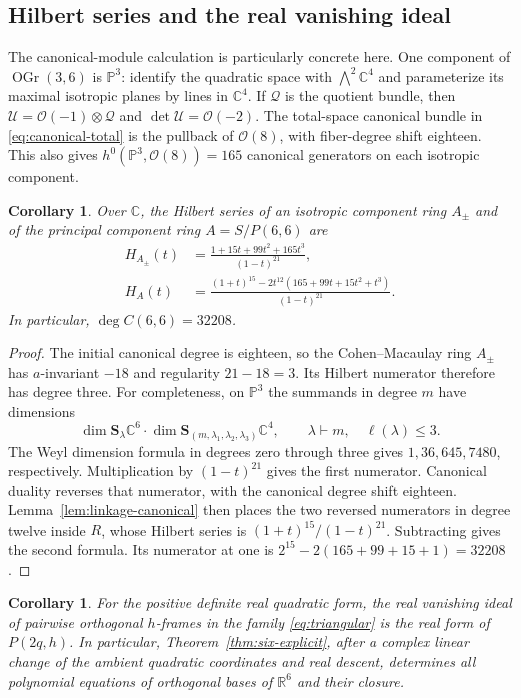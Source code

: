 \documentclass[11pt]{article}
\newtheorem{corollary}[theorem]{Corollary}
\theoremstyle{definition}
\theoremstyle{remark}
\numberwithin{equation}{section}
\DeclareMathOperator{\OGr}{OGr}
\newcommand{\CC}{\mathbb C}
\newcommand{\RR}{\mathbb R}
\newcommand{\PP}{\mathbb P}
\newcommand{\OO}{\mathcal O}
\newcommand{\UU}{\mathcal U}
\newcommand{\Schur}{\mathbf S}
\begin{document}
\subsection{Hilbert series and the real vanishing ideal}

The canonical-module calculation is particularly concrete here.
One component of $\OGr(3,6)$ is $\PP^3$: identify the quadratic
space with $\bigwedge^2\CC^4$ and parameterize its maximal isotropic
planes by lines in $\CC^4$. If $\mathcal Q$ is the quotient bundle,
then $\UU=\OO(-1)\otimes\mathcal Q$ and $\det\UU=\OO(-2)$.
The total-space canonical bundle in \eqref{eq:canonical-total} is
the pullback of $\OO(8)$, with fiber-degree shift eighteen. This
also gives $h^0(\PP^3,\OO(8))=165$ canonical generators on each
isotropic component.

\begin{corollary}\label{cor:Hilbert}
Over $\CC$, the Hilbert series of an isotropic component ring $A_\pm$
and of the principal component ring $A=S/P(6,6)$ are
\begin{align*}
 H_{A_\pm}(t)&=\frac{1+15t+99t^2+165t^3}{(1-t)^{21}},\\
 H_A(t)&=\frac{(1+t)^{15}-2t^{12}(165+99t+15t^2+t^3)}{(1-t)^{21}}.
\end{align*}
In particular, $\deg C(6,6)=32208$.
\end{corollary}

\begin{proof}
The initial canonical degree is eighteen, so the Cohen--Macaulay ring
$A_\pm$ has $a$-invariant $-18$ and regularity $21-18=3$. Its
Hilbert numerator therefore has degree three. For completeness, on
$\PP^3$ the summands in degree $m$ have dimensions
\[
 \dim\Schur_\lambda\CC^6\cdot
 \dim\Schur_{(m,\lambda_1,\lambda_2,\lambda_3)}\CC^4,
 \qquad\lambda\vdash m,\quad\ell(\lambda)\leq3.
\]
The Weyl dimension formula in degrees zero through three gives
$1,36,645,7480$, respectively. Multiplication by $(1-t)^{21}$ gives
the first numerator. Canonical duality reverses that numerator, with
the canonical degree shift eighteen. Lemma~\ref{lem:linkage-canonical}
then places the two reversed numerators in degree twelve inside
$R$, whose Hilbert series is $(1+t)^{15}/(1-t)^{21}$. Subtracting
gives the second formula. Its numerator at one is
$2^{15}-2(165+99+15+1)=32208$.
\end{proof}

\begin{corollary}\label{cor:real}
For the positive definite real quadratic form, the real vanishing ideal
of pairwise orthogonal $h$-frames in the family \eqref{eq:triangular}
is the real form of $P(2q,h)$. In particular, Theorem~\ref{thm:six-explicit},
after a complex linear change of the ambient quadratic coordinates
and real descent, determines all polynomial equations of orthogonal
bases of $\RR^6$ and their closure.
\end{corollary}
\end{document}

